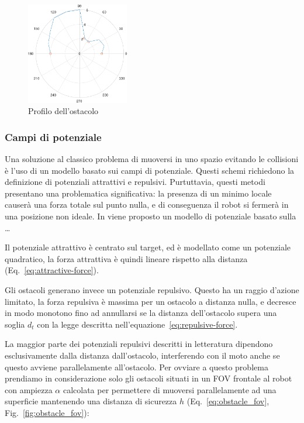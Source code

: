 \documentclass[a4paper]{article}
\begin{document}
	\begin{figure}[H]
		\centering
		\includegraphics[width=0.4\textwidth]{./img/bug.pdf}
		\caption{Profilo dell'ostacolo}
		\label{fig:bug}
	\end{figure}

	\subsubsection{Campi di potenziale}\label{subsec:Campi-di-potenziale}
	
	Una soluzione al classico problema di muoversi in uno spazio evitando le collisioni è l'uso di un modello basato sui campi di potenziale. Questi schemi richiedono la definizione di potenziali attrattivi e repulsivi. Purtuttavia, questi metodi presentano una problematica significativa: la presenza di un minimo locale causerà una forza totale sul punto nulla, e di conseguenza il robot si fermerà in una posizione non ideale. In \cite{volpe1990manipulator} viene proposto un modello di potenziale basato sulla  \ldots 

	Il potenziale attrattivo è centrato sul target, ed è modellato come un
	potenziale quadratico, la forza attrattiva è quindi lineare rispetto alla
	distanza (Eq.~\ref{eq:attractive-force}).

	Gli ostacoli generano invece un potenziale repulsivo. Questo ha un raggio
	d'azione limitato, la forza repulsiva è massima per un ostacolo a distanza
	nulla, e decresce in modo monotono fino ad annullarsi se la distanza
	dell'ostacolo supera una soglia $d_t$ con la legge descritta
	nell'equazione~\ref{eq:repulsive-force}.

	La maggior parte dei potenziali repulsivi descritti in letteratura
	dipendono esclusivamente dalla distanza dall'ostacolo, interferendo con il
	moto anche se questo avviene parallelamente all'ostacolo. Per ovviare a
	questo problema prendiamo in considerazione solo gli ostacoli situati in un
	FOV frontale al robot con ampiezza $ \alpha  $ calcolata per permettere di
	muoversi parallelamente ad una superficie mantenendo una distanza di
	sicurezza $ h $ (Eq.~\ref{eq:obstacle_fov}, Fig.~\ref{fig:obstacle_fov}): 
\end{document}
